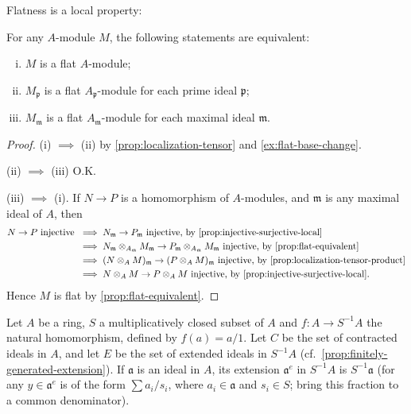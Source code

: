 Flatness is a local property:

\begin{proposition}\label{prop:flat-local}
For any $A$-module $M$, the following statements are equivalent:
\begin{enumerate}[i)]
    \item $M$ is a flat $A$-module;
    \item $M_{\mathfrak{p}}$ is a flat $A_{\mathfrak{p}}$-module for each prime ideal $\mathfrak{p}$;
    \item $M_{\mathfrak{m}}$ is a flat $A_{\mathfrak{m}}$-module for each maximal ideal $\mathfrak{m}$.
\end{enumerate}
\end{proposition}

\begin{proof}
(i) $\implies$ (ii) by \eqref{prop:localization-tensor} and \eqref{ex:flat-base-change}.

(ii) $\implies$ (iii) O.K.

(iii) $\implies$ (i). If $N \to P$ is a homomorphism of $A$-modules, and $\mathfrak{m}$ is any maximal ideal of $A$, then
\begin{align*}
    N \to P \text{ injective } &\implies N_{\mathfrak{m}} \to P_{\mathfrak{m}} \text{ injective, by \eqref{prop:injective-surjective-local}} \\
    &\implies N_{\mathfrak{m}} \otimes_{A_{\mathfrak{m}}} M_{\mathfrak{m}} \to P_{\mathfrak{m}} \otimes_{A_{\mathfrak{m}}} M_{\mathfrak{m}} \text{ injective, by \eqref{prop:flat-equivalent}} \\
    &\implies (N \otimes_A M)_{\mathfrak{m}} \to (P \otimes_A M)_{\mathfrak{m}} \text{ injective, by \eqref{prop:localization-tensor-product}} \\
    &\implies N \otimes_A M \to P \otimes_A M \text{ injective, by \eqref{prop:injective-surjective-local}.}
\end{align*}
Hence $M$ is flat by \eqref{prop:flat-equivalent}.
\end{proof}


Let $A$ be a ring, $S$ a multiplicatively closed subset of $A$ and $f \colon A \to S^{-1}A$ the natural homomorphism, defined by $f(a) = a/1$. Let $C$ be the set of contracted ideals in $A$, and let $E$ be the set of extended ideals in $S^{-1}A$ (cf.\ \eqref{prop:finitely-generated-extension}). If $\mathfrak{a}$ is an ideal in $A$, its extension $\mathfrak{a}^e$ in $S^{-1}A$ is $S^{-1}\mathfrak{a}$ (for any $y \in \mathfrak{a}^e$ is of the form $\sum a_i/s_i$, where $a_i \in \mathfrak{a}$ and $s_i \in S$; bring this fraction to a common denominator).

